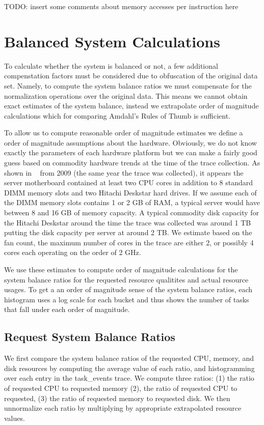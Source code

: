 \documentclass{sig-alternate}
\begin{document}
TODO: insert some comments about memory accesses per instruction here

\section{Balanced System Calculations}

To calculate whether the system is balanced or not, a few additional compenstation factors must be considered due to obfuscation of the original data set.
Namely, to compute the system balance ratios we must compensate for the normalization operations over the original data.
This means we cannot obtain exact estimates of the system balance, instead we extrapolate order of magnitude calculations which for comparing Amdahl's Rules of Thumb is sufficient.

To allow us to compute reasonable order of magnitude estimates we define a order of magnitude assumptions about the hardware.
Obviously, we do not know exactly the parameters of each hardware platform but we can make a fairly good guess based on commodity hardware trends at the time of the trace collection.
As shown in ~\cite{googlehw} from 2009 (the same year the trace was collected), it appears the server motherboard contained at least two CPU cores in addition to 8 standard DIMM memory slots and two Hitachi Deskstar hard drives.
If we assume each of the DIMM memory slots contains 1 or 2 GB of RAM, a typical server would have between 8 and 16 GB of memory capacity.
A typical commodity disk capacity for the Hitachi Deskstar around the time the trace was collected was around 1 TB putting the disk capacity per server at around 2 TB.
We estimate based on the fan count, the maximum number of cores in the trace are either 2, or possibly 4 cores each operating on the order of 2 GHz.

We use these estimates to compute order of magnitude calculations for the system balance ratios for the requested resource qualitites and actual resource usages.
To get a an order of magnitude sense of the system balance ratios, each histogram uses a log scale for each bucket and thus shows the number of tasks that fall under each order of magnitude.

\subsection{Request System Balance Ratios}

We first compare the system balance ratios of the requested CPU, memory, and disk resources by computing the average value of each ratio, and histogramming over each entry in the task\_events trace.
We compute three ratios: (1) the ratio of requested CPU to requested memory (2), the ratio of requested CPU to requested, (3) the ratio of requested memory to requested disk.
We then unnormalize each ratio by multiplying by appropriate extrapolated resource values.
\end{document}
